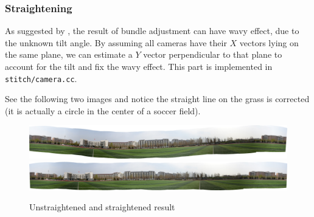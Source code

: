 \subsubsection{Straightening}
As suggested by \cite{panoramic-sift}, the result of bundle adjustment
can have wavy effect, due to the unknown tilt angle.
By assuming all cameras have their $X$ vectors lying on the same plane,
we can estimate a $Y$ vector perpendicular to that plane
to account for the tilt and fix the wavy effect. This part
is implemented in \verb|stitch/camera.cc|.

See the following two images and notice the straight line on the grass
is corrected (it is actually a circle in the center of a soccer field).
\begin{figure}[H]
  \centering
  \includegraphics[width=\textwidth]{res/wavy.jpg}
  \includegraphics[width=\textwidth]{res/unwavy.jpg}
  \caption{Unstraightened and straightened result\label{fig:general-straighten}}
\end{figure}

